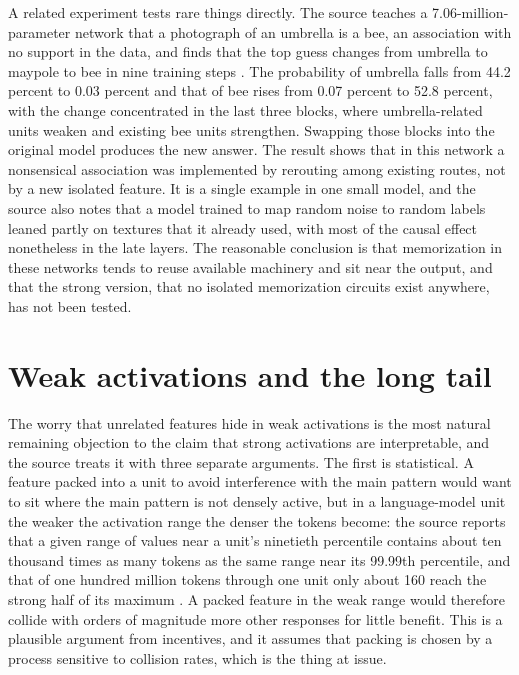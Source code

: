 \documentclass[11pt]{article}
\begin{document}
A related experiment tests rare things directly. The source teaches a 7.06-million-parameter network that a photograph of an umbrella is a bee, an association with no support in the data, and finds that the top guess changes from umbrella to maypole to bee in nine training steps \cite[\emph{Rare Things and Memorization}]{cammarata}. The probability of umbrella falls from 44.2 percent to 0.03 percent and that of bee rises from 0.07 percent to 52.8 percent, with the change concentrated in the last three blocks, where umbrella-related units weaken and existing bee units strengthen. Swapping those blocks into the original model produces the new answer. The result shows that in this network a nonsensical association was implemented by rerouting among existing routes, not by a new isolated feature. It is a single example in one small model, and the source also notes that a model trained to map random noise to random labels leaned partly on textures that it already used, with most of the causal effect nonetheless in the late layers. The reasonable conclusion is that memorization in these networks tends to reuse available machinery and sit near the output, and that the strong version, that no isolated memorization circuits exist anywhere, has not been tested.

\section{Weak activations and the long tail}

The worry that unrelated features hide in weak activations is the most natural remaining objection to the claim that strong activations are interpretable, and the source treats it with three separate arguments. The first is statistical. A feature packed into a unit to avoid interference with the main pattern would want to sit where the main pattern is not densely active, but in a language-model unit the weaker the activation range the denser the tokens become: the source reports that a given range of values near a unit's ninetieth percentile contains about ten thousand times as many tokens as the same range near its 99.99th percentile, and that of one hundred million tokens through one unit only about 160 reach the strong half of its maximum \cite[\emph{Do Weak Activations Matter?}]{cammarata}. A packed feature in the weak range would therefore collide with orders of magnitude more other responses for little benefit. This is a plausible argument from incentives, and it assumes that packing is chosen by a process sensitive to collision rates, which is the thing at issue.
\end{document}
